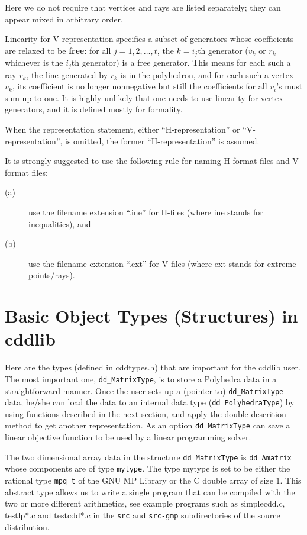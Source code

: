 \documentclass[11pt]{article}
\newcommand {\0} {{\bf 0}}
\begin{document}
\bigskip
\noindent
Here we do not require that
vertices and rays are listed
separately; they can appear mixed in arbitrary
order.

Linearity for V-representation specifies a subset of generators
whose coefficients are relaxed
to be {\bf free}:  for all $j=1,2, \ldots, t$, the $k=i_j$th generator ($v_{k}$ or $r_k$ whichever is the $i_j$th generator) is a free generator. 
This means for each such a ray $r_k$, 
the line generated by $r_k$ is in the polyhedron,
and for each such a vertex $v_k$, its coefficient is no longer nonnegative
but still the coefficients for all $v_i$'s must sum up to one. 
It is highly unlikely that one needs to
use linearity for vertex generators, and it is defined mostly
for formality.

When the representation statement, either ``H-representation''
or ``V-representation'', is omitted, the former
``H-representation'' is assumed.

It is strongly suggested to use the following rule for naming
H-format files and V-format files:   
\begin{description}
\item[(a)] use the filename  extension ``.ine'' for H-files (where ine stands for inequalities), and 
\item[(b)]  use the filename  extension ``.ext'' for V-files (where ext stands for extreme points/rays). 
\end{description}


\section{Basic Object Types (Structures) in cddlib}  \label{DATASTR}

Here are the types (defined in cddtypes.h) that are 
important for the cddlib user.  The most important one, 
{\tt dd\_MatrixType},
is to store a Polyhedra data in a straightforward manner.
Once the user sets up a (pointer to)  {\tt dd\_MatrixType} data,
he/she can load the data to an internal data type ({\tt dd\_PolyhedraType})
by using functions described in the next section, and apply
the double descrition method to get another representation.
As an option  {\tt dd\_MatrixType} can save a linear objective function
to be used by a linear programming solver.

The two dimensional array data in the structure {\tt dd\_MatrixType} is
{\tt dd\_Amatrix} whose components are of type {\tt mytype\/}.
The type mytype is set to be either the rational type {\tt mpq\_t} of 
the GNU MP Library or the C double array of size $1$.
This abstract type allows us to write a single program that can
be compiled with the two or more different arithmetics, see example
programs such as simplecdd.c, testlp*.c and testcdd*.c
in the {\tt src} and {\tt src-gmp} subdirectories of the source
distribution.
\end{document}
